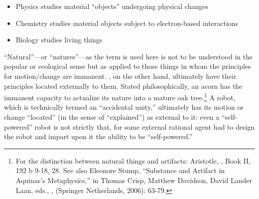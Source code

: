 \begin{itemize}
\item Physics studies  material ``objects'' undergoing physical changes
\item Chemistry studies  material objects subject to electron-based interactions
\item Biology studies  living things
\end{itemize}

``Natural''---or ``natures''---as the term is used here is not to be understood in the popular or ecological sense but as applied to those things in whom the principles for motion/change are immanent. , on the other hand, ultimately have their principles located externally to them. Stated philosophically, an acorn has the immanent capacity to actualize its nature into a mature oak tree.\footnote{For the distinction between natural things and artifacts: Aristotle, , Book II, 192 b 9-18, 28. See also Eleonore Stump, ``Substance and Artifact in Aquinas's Metaphysics,'' in Thomas Crisp, Matthew Davidson, David Lander Laan, eds., , (Springer Netherlands, 2006): 63-79.} A robot, which is technically termed an ``accidental unity,'' ultimately has its motion or change ``located'' (in the sense of ``explained'') as external to it: even a ``self-powered'' robot is not strictly that, for some external rational agent had to design the robot and impart upon it the ability to be ``self-powered.''

